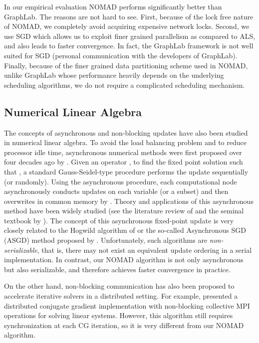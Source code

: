 \documentclass{vldb}
\begin{document}
In our empirical evaluation NOMAD performs significantly better than
GraphLab. The reasons are not hard to see. First, because of the lock
free nature of NOMAD, we completely avoid acquiring expensive network
locks. Second, we use SGD which allows us to exploit finer grained
parallelism as compared to ALS, and also leads to faster convergence. In
fact, the GraphLab framework is not well suited for SGD (personal
communication with the developers of GraphLab). Finally, because of the
finer grained data partitioning scheme used in NOMAD, unlike GraphLab
whose performance heavily depends on the underlying scheduling
algorithms, we do not require a complicated scheduling mechanism.

\subsection{Numerical Linear Algebra}
\label{sec:NumerLineAlgebra}

The concepts of asynchronous and non-blocking updates have also been
studied in numerical linear algebra. To avoid the load balancing problem
and to reduce processor idle time, asynchronous numerical methods were
first proposed over four decades ago by \citet{ChaMir69}.  Given an
operator , to
find the fixed point solution  such that , a
standard Gauss-Seidel-type procedure performs the update
 sequentially (or randomly).  Using
the asynchronous procedure, each computational node asynchronously
conducts updates on each variable (or a subset)  and then overwrites  in common
memory by .  Theory and applications of this
asynchronous method have been widely studied (see the literature review
of \citet{FroSzy00} and the seminal textbook by \citet{BerTsi97a}).  The
concept of this asynchronous fixed-point update is very closely related
to the Hogwild algorithm of \citet{RecReWriNiu11} or the so-called
Asynchronous SGD (ASGD) method proposed by
\citet{TefMakGem12}. Unfortunately, such algorithms are
\emph{non-serializable}, that is, there may not exist an equivalent
update ordering in a serial implementation.  In contrast, our NOMAD
algorithm is not only asynchronous but also serializable, and therefore
achieves faster convergence in practice.

On the other hand, non-blocking communication has also been proposed to
accelerate iterative solvers in a distributed setting.  For example,
\citet{HoeGotRehLum06} presented a distributed conjugate gradient
implementation with non-blocking collective MPI operations for solving
linear systems. However, this algorithm still requires synchronization
at each CG iteration, so it is very different from our NOMAD algorithm.
\end{document}
